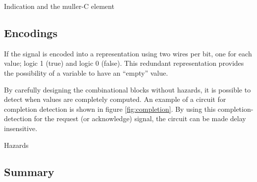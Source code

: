 Indication and the muller-C element

\subsection{Encodings}

If the signal is encoded into a representation using two wires per
bit, one for each value; logic 1 (true) and logic 0 (false). This
redundant representation provides the possibility of a variable to
have an ``empty'' value. 

By carefully designing the combinational blocks without hazards, it is
possible to detect when values are completely computed. An example of
a circuit for completion detection is shown in figure
\ref{fig:completion}. By using this completion-detection for the
request (or acknowledge) signal, the circuit can be made delay
insensitive.

Hazards

\subsection{Summary}



